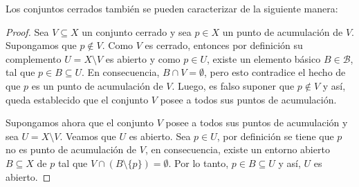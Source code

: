 
Los conjuntos cerrados también se pueden caracterizar de la siguiente
manera:

\begin{proof}
Sea $V\subseteq X$ un conjunto cerrado y sea $p\in X$ un punto de acumulación
de $V$. Supongamos que $p\notin V$. Como $V$ es cerrado, entonces por definición
su complemento $U=X\setminus V$ es abierto y como $p\in U$, existe
un elemento básico $B\in\mathcal{B}$, tal que
$p\in B\subseteq U$. En consecuencia, $B\cap V=\emptyset$,
pero esto contradice el hecho de que $p$ es un punto de acumulación de $V$.
Luego, es falso suponer que $p\notin V$ y así, queda establecido que el
conjunto $V$ posee a todos sus puntos de acumulación.

Supongamos ahora que el conjunto $V$ posee a todos sus puntos de acumulación y
sea $U=X\setminus V$. Veamos que $U$ es abierto. Sea $p\in U$, por definición
se tiene que $p$ no es punto de acumulación de $V$, en consecuencia,
existe un entorno abierto $B\subseteq X$ de $p$ tal que $V\cap (B\setminus\{p\})=\emptyset$.
Por lo tanto, $p\in B\subseteq U$ y así, $U$ es abierto.
\end{proof}

